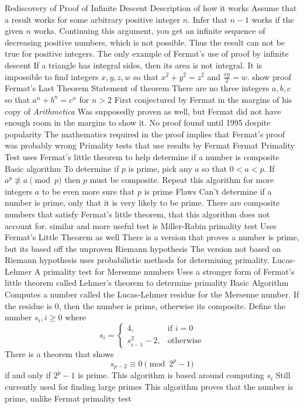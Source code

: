 \documentclass[11pt]{article}
\begin{document}
\begin{outline}[enumerate]
\1 Rediscovery of Proof of Infinite Descent
    \2 Description of how it works
        \3 Assume that a result works for some arbitrary positive integer $n$.
        \3 Infer that $n-1$ works if the given $n$ works.
        \3 Continuing this argument, you get an infinite sequence of decreasing positive numbers, which is not possible.
        \3 Thus the result can not be true for positive integers.
    \2 The only example of Fermat's use of proof by infinite descent
        \3 If a triangle has integral sides, then its area is not integral.
        \3 It is impossible to find integers $x,y,z,w$ so that $x^2 + y^2 = z^2$ and $\frac{xy}{2} = w$.
        \3 show proof
\1 Fermat's Last Theorem
    \2 Statement of theorem
        \3 There are no three integers $a,b,c$ so that $a^n + b^n = c^n$ for $n>2$
    \2 First conjectured by Fermat in the margins of his copy of \emph{Arithmetica}
    \2 Was supposedly proven as well, but Fermat did not have enough room in the margins to show it.
    \2 No proof found until 1995 despite popularity
    \2 The mathematics required in the proof implies that Fermat's proof was probably wrong
\1 Primality tests that use results by Fermat
    \2 Fermat Primality Test
        \3 uses Fermat's little theorem to help determine if a number is composite
        \3 Basic algorithm
            \4 To determine if $p$ is prime, pick any $a$ so that $0 < a < p$.
               If $a^p \not\equiv a \pmod{p}$ then $p$ must be composite.
               Repeat this algorithm for more integers $a$ to be even more sure that $p$ is prime
        \3 Flaws
            \4 Can't determine if a number is prime, only that it is very likely to be prime.
            \4 There are composite numbers that satisfy Fermat's little theorem, that this algorithm does not account for.
        \3 similar and more useful test is Miller-Rabin primality test
            \4 Uses Fermat's Little Theorem as well
            \4 There is a version that proves a number is prime, but its based off the unproven Riemann hypothesis
            \4 The version not based on Riemann hypothesis uses probabilistic methods for determining primality.
    \2 Lucas-Lehmer
        \3 A primality test for Mersenne numbers
        \3 Uses a stronger form of Fermat's little theorem called Lehmer's theorem to determine primality
        \3 Basic Algorithm
            \4 Computes a number called the Lucas-Lehmer residue for the Mersenne number.
                If the residue is 0, then the number is prime, otherwise its composite.
            \4 Define the number $s_i, i \ge 0$ where
                \[s_i = \begin{cases}
                    4,           & \text{if } i=0\\
                    s^2_{i-1}-2, & \text{otherwise}
                \end{cases}\]
            \4 There is a theorem that shows \[s_{p-2}\equiv0 \pmod{2^{p}-1}\] if and only if $2^p-1$ is prime.
            \4 This algorithm is based around computing $s_i$
        \3 Still currently used for finding large primes
        \3 This algorithm proves that the number is prime, unlike Fermat primality test
\end{outline}
\end{document}
